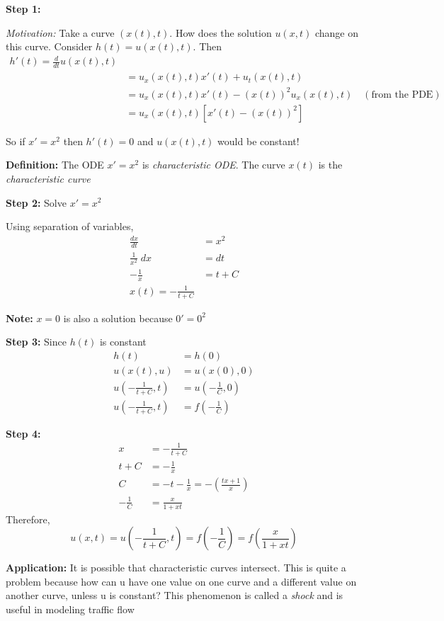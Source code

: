 \documentclass[12pt]{article}
\begin{document}
\textbf{Step 1:} 

\emph{Motivation:} Take a curve $(x(t), t)$. How does the solution $u(x, t)$ change on this curve. Consider $h(t) = u(x(t), t)$. Then 
\begin{align*}
    h'(t) = \frac{d}{dt}u(x(t), t)\\
    &= u_x(x(t), t)x'(t) + u_t(x(t), t)\\
    &= u_x(x(t), t)x'(t) - (x(t))^2u_x(x(t), t)\quad (\text{from the PDE})\\
    &=u_x(x(t), t)[x'(t)- (x(t))^2]
\end{align*}

So if $x' = x^2$ then $h'(t) = 0$ and $u(x(t), t)$ would be constant!

\textbf{Definition:} The ODE $x' = x^2$ is \emph{characteristic ODE}. The curve $x(t)$ is the \emph{characteristic curve}

\textbf{Step 2:} Solve $x' = x^2$

Using separation of variables, 
\begin{align*}
    \frac{dx}{dt} &= x^2\\
    \frac{1}{x^2}\; dx &= dt\\
    -\frac{1}{x} &= t + C\\
    x(t) = -\frac{1}{t + C}
\end{align*}

\textbf{Note:} $x=0$ is also a solution because $0' =0^2$

\textbf{Step 3:} Since $h(t)$ is constant 
\begin{align*}
    h(t) &= h(0)\\
    u(x(t), u) &= u(x(0), 0)\\
    u\left(-\frac{1}{t + C}, t\right) &= u\left(-\frac{1}{C}, 0\right)\\
    u\left(-\frac{1}{t + C}, t\right) &= f(-\frac{1}{C})
\end{align*}

\textbf{Step 4:}
\begin{align*}
    x &= -\frac{1}{t + C}\\
    t + C &= -\frac{1}{x}\\
    C &= - t -\frac{1}{x} = -\left(\frac{tx + 1}{x}\right)\\
    -\frac{1}{C} &= \frac{x}{1 + xt}
\end{align*}
Therefore, 
\[u(x, t) = u\left(-\frac{1}{t + C}, t\right) = f(-\frac{1}{C}) = \boxed{f\left(\frac{x}{1 + xt}\right)}\]

\textbf{Application:} It is possible that characteristic curves intersect. This is quite a problem because how can u have one value on one curve and a different value on another curve, unless u is constant? This phenomenon is called a \emph{shock} and is useful in modeling traffic flow
\end{document}
